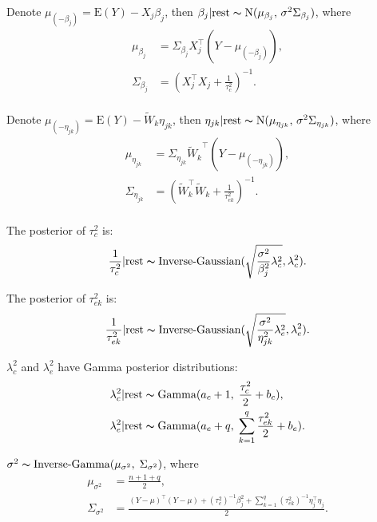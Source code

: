 \documentclass[12pt]{article}
\begin{document}
Denote $\mu_{(-\beta_j)}=\text{E}(Y)-X_{j}\beta_j$, then $\beta_{j}|\text{rest} \thicksim \text{N}(\mu_{\beta_{j}}, \, \sigma^{2} \Sigma_{\beta_{j}})$, where
	\begin{equation*}
	\begin{aligned}
	\mu_{\beta_{j}} &= \Sigma_{\beta_{j}} X_{j}^\top(Y-\mu_{(-\beta_j)}), \\
	\Sigma_{\beta_{j}} &= \left(X_{j}^\top X_{j} + \frac{1}{\tau_{c}^{2}} \right)^{-1}. \\
	\end{aligned}
	\end{equation*}

Denote $\mu_{(-\eta_{jk})}=\text{E}(Y)-\tilde{W}_{k}\eta_{jk}$, then $\eta_{jk}|\text{rest} \thicksim \text{N}(\mu_{\eta_{jk}}, \, \sigma^{2}\Sigma_{\eta_{jk}})$, where
	\begin{equation*}
	\begin{aligned}
	\mu_{\eta_{jk}} &= \Sigma_{\eta_{jk}} {\tilde{W}_{k}}^\top(Y-\mu_{(-\eta_{jk})}), \\
	\Sigma_{\eta_{jk}} &= \left(\tilde{W}_{k}^\top \tilde{W}_{k} + \frac{1}{\tau_{ek}^{2}} \right)^{-1}. \\
	\end{aligned}
	\end{equation*}

The posterior of $\tau_{c}^{2}$ is:
	\begin{equation*}
	\frac{1}{\tau_{c}^{2}}|\text{rest} \thicksim \text{Inverse-Gaussian}(\sqrt{\frac{\sigma^{2}}{\beta_{j}^{2}}\lambda_{c}^{2}}, \lambda_{c}^{2}).
	\end{equation*}

The posterior of $\tau_{ek}^{2}$ is:
	\begin{equation*}
	\frac{1}{\tau_{ek}^{2}}|\text{rest} \thicksim \text{Inverse-Gaussian}(\sqrt{\frac{\sigma^{2}}{\eta_{jk}^{2}}\lambda_{e}^{2}}, \lambda_{e}^{2}).
	\end{equation*}

$\lambda_{c}^{2}$ and $\lambda_{e}^{2}$ have Gamma posterior distributions:
\begin{equation*}
\begin{aligned}
\lambda_{c}^{2}|\text{rest} & \thicksim \text{Gamma} (a_c+1,\; \frac{\tau_{c}^{2}}{2}+b_c),\\
\lambda_{e}^{2}|\text{rest} & \thicksim \text{Gamma} (a_e+q,\; \sum_{k=1}^{q}\frac{\tau_{ek}^{2}}{2}+b_e).\\
\end{aligned}
\end{equation*}


$\sigma^2 \thicksim \text{Inverse-Gamma}(\mu_{\sigma^2}, \; \Sigma_{\sigma^2})$, where
\begin{equation*}
\begin{aligned}
\mu_{\sigma^2} &= \frac{n+1+q}{2},\\
\Sigma_{\sigma^2} &= \frac{(Y-\mu)^\top (Y-\mu)+(\tau_{c}^{2})^{-1}\beta_{j}^{2} + \sum_{k=1}^{q}(\tau_{ek}^{2})^{-1} \eta_{j}^\top \eta_{j}}{2}.
\end{aligned}
\end{equation*}
\end{document}
